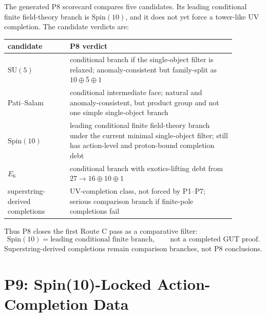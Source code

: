 \documentclass[11pt]{article}
\newcommand{\SU}{\mathrm{SU}}
\newcommand{\Spin}{\mathrm{Spin}}
\begin{document}
The generated P8 scorecard compares five candidates.  Its leading conditional
finite field-theory branch is $\Spin(10)$, and it does not yet force a
tower-like UV completion.
The candidate verdicts are:
\begin{center}
\small
\begin{tabular}{
  >{\raggedright\arraybackslash}p{0.24\linewidth}
  >{\raggedright\arraybackslash}p{0.64\linewidth}}
\toprule
candidate & P8 verdict \\
\midrule
$\SU(5)$ &
conditional branch if the single-object filter is relaxed; anomaly-consistent
but family-split as $10\oplus\bar 5\oplus 1$ \\
Pati--Salam &
conditional intermediate face; natural and anomaly-consistent, but product
group and not one simple single-object branch \\
$\Spin(10)$ &
leading conditional finite field-theory branch under the current minimal
single-object filter; still has action-level and proton-bound completion debt\\
$E_6$ &
conditional branch with exotics-lifting debt from $27\to16\oplus10\oplus1$ \\
superstring-derived completions &
UV-completion class, not forced by P1--P7; serious comparison branch if
finite-pole completions fail \\
\bottomrule
\end{tabular}
\end{center}

Thus P8 closes the first Route C pass as a comparative filter:
\begin{equation}
  \Spin(10)
  =
  \text{leading conditional finite branch},
  \qquad
  \text{not a completed GUT proof}.
\end{equation}
Superstring-derived completions remain comparison branches, not P8
conclusions.

\section{P9: Spin(10)-Locked Action-Completion Data}
\end{document}
